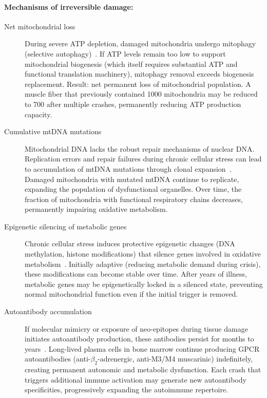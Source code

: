 \paragraph{Mechanisms of irreversible damage:}

\begin{description}
    \item[Net mitochondrial loss] During severe ATP depletion, damaged mitochondria undergo mitophagy (selective autophagy)~\cite{Syed2025}. If ATP levels remain too low to support mitochondrial biogenesis (which itself requires substantial ATP and functional translation machinery), mitophagy removal exceeds biogenesis replacement. Result: net permanent loss of mitochondrial population. A muscle fiber that previously contained 1000 mitochondria may be reduced to 700 after multiple crashes, permanently reducing ATP production capacity.

    \item[Cumulative mtDNA mutations] Mitochondrial DNA lacks the robust repair mechanisms of nuclear DNA. Replication errors and repair failures during chronic cellular stress can lead to accumulation of mtDNA mutations through clonal expansion~\cite{Lawless2015mtdna_damage}. Damaged mitochondria with mutated mtDNA continue to replicate, expanding the population of dysfunctional organelles. Over time, the fraction of mitochondria with functional respiratory chains decreases, permanently impairing oxidative metabolism.

    \item[Epigenetic silencing of metabolic genes] Chronic cellular stress induces protective epigenetic changes (DNA methylation, histone modifications) that silence genes involved in oxidative metabolism~\cite{deVega2021dna_methylation}. Initially adaptive (reducing metabolic demand during crisis), these modifications can become stable over time. After years of illness, metabolic genes may be epigenetically locked in a silenced state, preventing normal mitochondrial function even if the initial trigger is removed.

    \item[Autoantibody accumulation] If molecular mimicry or exposure of neo-epitopes during tissue damage initiates autoantibody production, these antibodies persist for months to years~\cite{Loebel2016,Bynke2020}. Long-lived plasma cells in bone marrow continue producing GPCR autoantibodies (anti-$\beta_2$-adrenergic, anti-M3/M4 muscarinic) indefinitely, creating permanent autonomic and metabolic dysfunction. Each crash that triggers additional immune activation may generate new autoantibody specificities, progressively expanding the autoimmune repertoire.


\end{description}
